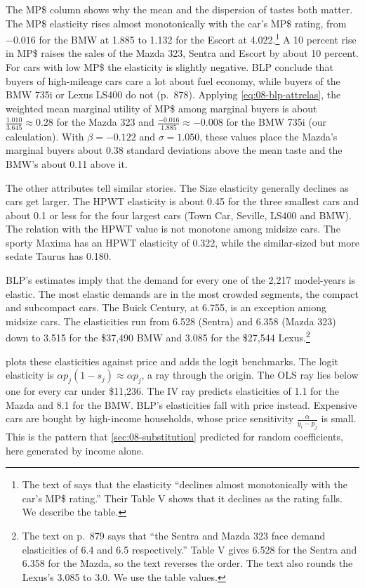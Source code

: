 The MP\$ column shows why the mean and the dispersion of tastes both matter. The MP\$ elasticity rises
almost monotonically with the car's MP\$ rating, from $-0.016$ for the BMW at 1.885 to 1.132 for the
Escort at 4.022.\footnote{The text of \citet[p.~878]{BerryLevinsohnPakes1995} says that the elasticity
``declines almost monotonically with the car's MP\$ rating.'' Their Table V shows that it declines as the
rating falls. We describe the table.} A 10 percent rise in MP\$ raises the sales of the
Mazda 323, Sentra and Escort by about 10 percent. For cars with low MP\$ the elasticity is slightly
negative. BLP conclude that buyers of high-mileage cars care a lot about fuel economy, while buyers of
the BMW 735i or Lexus LS400 do not (p.~878). Applying \eqref{eq:08-blp-attrelas}, the weighted mean
marginal utility of MP\$ among marginal buyers is about $\frac{1.010}{3.645}\approx0.28$ for the Mazda
323 and $\frac{-0.016}{1.885}\approx-0.008$ for the BMW 735i (our calculation). With $\beta=-0.122$ and
$\sigma=1.050$, these values place the Mazda's marginal buyers about 0.38 standard deviations above the
mean taste and the BMW's about 0.11 above it.

The other attributes tell similar stories. The Size elasticity generally declines as cars get larger.
The HPWT elasticity is about 0.45 for the three smallest cars and about 0.1 or less for the four largest
cars (Town Car, Seville, LS400 and BMW). The relation with the HPWT value is not monotone among midsize
cars. The sporty Maxima has an HPWT elasticity of 0.322, while the similar-sized but more sedate Taurus
has 0.180.

BLP's estimates imply that the demand for every one of the 2,217 model-years is elastic. The most
elastic demands are in the most crowded segments, the compact and subcompact cars. The Buick Century, at
6.755, is an exception among midsize cars. The elasticities run from 6.528 (Sentra) and 6.358 (Mazda
323) down to 3.515 for the \$37,490 BMW and 3.085 for the \$27,544 Lexus.\footnote{The text on p.~879
says that ``the Sentra and Mazda 323 face demand elasticities of 6.4 and 6.5 respectively.'' Table V
gives 6.528 for the Sentra and 6.358 for the Mazda, so the text reverses the order. The text also rounds
the Lexus's 3.085 to 3.0. We use the table values.}

 plots these elasticities against price and adds the logit benchmarks. The
logit elasticity is $\alpha p_j(1-s_j)\approx\alpha p_j$, a ray through the origin. The OLS ray lies
below one for every car under \$11,236. The IV ray predicts elasticities of 1.1 for the Mazda and 8.1
for the BMW. BLP's elasticities fall with price instead. Expensive cars are bought by high-income
households, whose price sensitivity $\frac{\alpha}{y_i-p_j}$ is small. This is the pattern that
\cref{sec:08-substitution} predicted for random coefficients, here generated by income alone.

